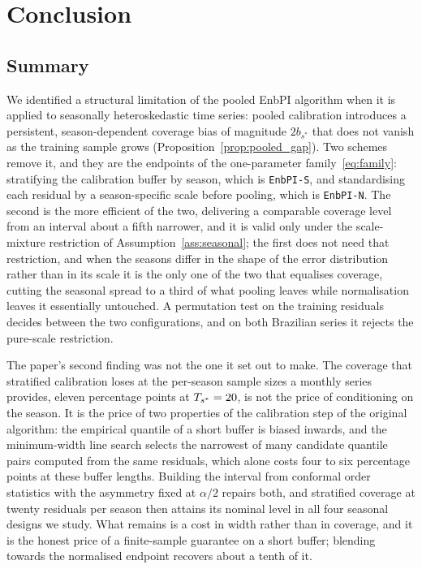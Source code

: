 \section{Conclusion}
\label{sec:conclusion}

\subsection{Summary}
\label{sec:conclusion:summary}

We identified a structural limitation of the pooled EnbPI algorithm
\citep{xu2023conformal} when it is applied to seasonally
heteroskedastic time series: pooled calibration introduces a
persistent, season-dependent coverage bias of magnitude $2b_{s^*}$
that does not vanish as the training sample grows
(Proposition~\ref{prop:pooled_gap}).  Two schemes remove it, and they
are the endpoints of the one-parameter family~\eqref{eq:family}:
stratifying the calibration buffer by season, which is
\texttt{EnbPI-S}, and standardising each residual by a season-specific
scale before pooling, which is \texttt{EnbPI-N}.  The second is the
more efficient of the two, delivering a comparable coverage level from
an interval about a fifth narrower, and it is valid only under the
scale-mixture restriction of Assumption~\ref{ass:seasonal}; the first
does not need that restriction, and when the seasons differ in the
shape of the error distribution rather than in its scale it is the only
one of the two that equalises coverage, cutting the seasonal spread to
a third of what pooling leaves while normalisation leaves it
essentially untouched.  A permutation test on the training residuals
decides between the two configurations, and on both Brazilian series it
rejects the pure-scale restriction.

The paper's second finding was not the one it set out to make.  The
coverage that stratified calibration loses at the per-season sample
sizes a monthly series provides, eleven percentage points at
$T_{s^*} = 20$, is not the price of conditioning on the season.  It is the
price of two properties of the calibration step of the original
algorithm: the empirical quantile of a short buffer is biased inwards,
and the minimum-width line search selects the narrowest of many
candidate quantile pairs computed from the same residuals, which alone
costs four to six percentage points at these buffer lengths.  Building
the interval from conformal order statistics with the asymmetry fixed
at $\alpha/2$ repairs both, and stratified coverage at twenty residuals
per season then attains its nominal level in all four seasonal designs
we study.  What remains is a cost in width rather than in coverage, and
it is the honest price of a finite-sample guarantee on a short buffer;
blending towards the normalised endpoint recovers about a tenth of it.

